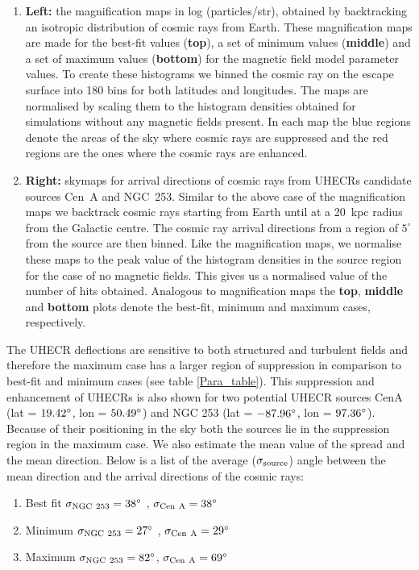 \documentclass[usenatbib]{mnras}
\newcommand{\Arjen}[1]{{\color{brown}#1}}
\begin{document}
\begin{enumerate}
    \item {\bf Left: } the magnification maps in log (particles/str), obtained by backtracking an isotropic distribution of cosmic rays from Earth. These magnification maps are made for the best-fit values (\textbf{top}), a set of minimum values (\textbf{middle}) and a set of maximum values (\textbf{bottom}) for the magnetic field model parameter values.
    To create these histograms we binned the cosmic ray on the escape surface into 180 bins for both latitudes and longitudes. The maps are normalised by scaling them to the histogram densities obtained  for simulations without any magnetic fields present. In each map the blue regions denote the areas of the sky where cosmic rays are suppressed and the red regions are the ones where the cosmic rays are enhanced.
    
    \item {\bf Right: } skymaps for arrival directions
    of cosmic rays from UHECRs candidate sources Cen~A and NGC~253. Similar to the above case of the magnification maps we backtrack cosmic rays starting from Earth until at a 20~kpc radius from the Galactic centre. The cosmic ray arrival directions from a region of $5^{\circ}$ from the source are then binned.  Like the magnification maps, we normalise these maps to the peak value of the histogram densities in the source region for the case of no magnetic fields.  This gives us a normalised value of the number of hits obtained. Analogous to magnification maps the \textbf{top}, \textbf{middle} and \textbf{bottom} plots denote the best-fit, minimum and maximum cases, respectively. 
    \end{enumerate}



    
The UHECR deflections are sensitive to both structured and turbulent fields and therefore the maximum case has a larger region of suppression in comparison to best-fit and minimum cases (see table \ref{Para_table}). This suppression and enhancement of UHECRs is also shown for two potential UHECR sources CenA (lat = $\rm 19.42^{\circ}$, lon = $\rm 50.49^{\circ}$) and NGC 253 (lat = $\rm -87.96^{\circ}$, lon = $\rm 97.36^{\circ}$). Because of their positioning in the sky both the sources lie in the suppression region in the maximum case. We also estimate the mean value of the spread and the mean direction. Below is a list of the average ($\sigma_{\rm source}$) angle between the mean direction and the arrival directions of the cosmic rays:
    \begin{enumerate}
        \item Best fit $\sigma_{\rm NGC~253} = 38^{\circ}$ , {$\sigma_{\rm Cen~A} = 38^{\circ}$}
        \item Minimum $\sigma_{\rm NGC~253} = 27^{\circ}$ , $\sigma_{\rm Cen~A} = 29^{\circ}$
        \item Maximum $\sigma_{\rm NGC~253} = 82^{\circ}$, $\sigma_{\rm Cen~A} = 69^{\circ}$
\end{enumerate}
\end{document}
